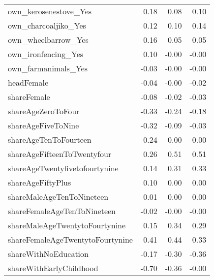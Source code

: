 \begin{longtable}{lrrr}
own\_kerosenestove\_Yes &               0.18 &                0.08 &                      0.10 \\
own\_charcoaljiko\_Yes &               0.12 &                0.10 &                      0.14 \\
own\_wheelbarrow\_Yes &               0.16 &                0.05 &                      0.05 \\
own\_ironfencing\_Yes &               0.10 &               -0.00 &                     -0.00 \\
own\_farmanimals\_Yes &              -0.03 &               -0.00 &                     -0.00 \\
headFemale &              -0.04 &               -0.00 &                     -0.02 \\
shareFemale &              -0.08 &               -0.02 &                     -0.03 \\
shareAgeZeroToFour &              -0.33 &               -0.24 &                     -0.18 \\
shareAgeFiveToNine &              -0.32 &               -0.09 &                     -0.03 \\
shareAgeTenToFourteen &              -0.24 &               -0.00 &                     -0.00 \\
shareAgeFifteenToTwentyfour &               0.26 &                0.51 &                      0.51 \\
shareAgeTwentyfivetofourtynine &               0.14 &                0.31 &                      0.33 \\
shareAgeFiftyPlus &               0.10 &                0.00 &                      0.00 \\
shareMaleAgeTenToNineteen &               0.01 &                0.00 &                      0.00 \\
shareFemaleAgeTenToNineteen &              -0.02 &               -0.00 &                     -0.00 \\
shareMaleAgeTwentytoFourtynine &               0.15 &                0.34 &                      0.29 \\
shareFemaleAgeTwentytoFourtynine &               0.41 &                0.44 &                      0.33 \\
shareWithNoEducation &              -0.17 &               -0.30 &                     -0.36 \\
shareWithEarlyChildhood &              -0.70 &               -0.36 &                     -0.00 \\

\end{longtable}
